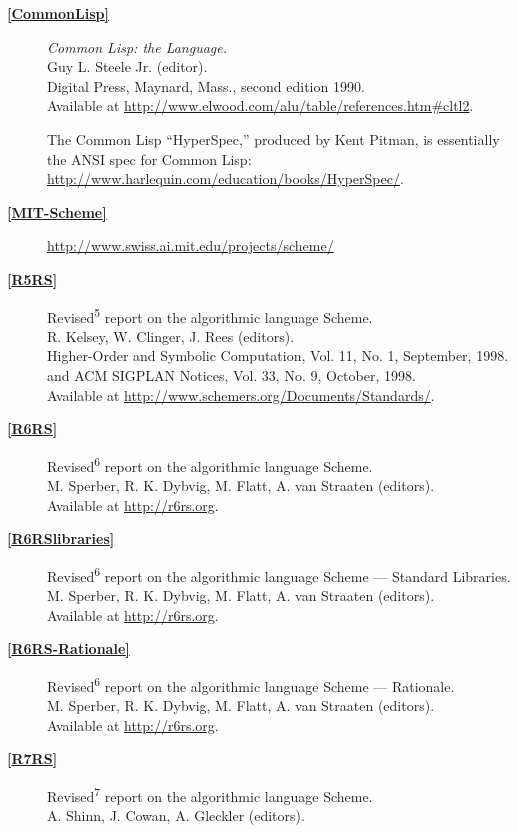 \begin{description}
\item[\textbf{\href{}{{[}CommonLisp{]}}}]
\emph{Common Lisp: the Language.}\\
Guy L. Steele Jr. (editor).\\
Digital Press, Maynard, Mass., second edition 1990.\\
Available at
\url{http://www.elwood.com/alu/table/references.htm\#cltl2}.

The Common Lisp ``HyperSpec,'' produced by Kent Pitman, is essentially
the ANSI spec for Common Lisp:
\url{http://www.harlequin.com/education/books/HyperSpec/}.
\item[\textbf{\href{}{{[}MIT-Scheme{]}}} ]
\url{http://www.swiss.ai.mit.edu/projects/scheme/}
\item[\textbf{\href{}{{[}R5RS{]}}}]
Revised\textsuperscript{5} report on the algorithmic language Scheme.\\
R. Kelsey, W. Clinger, J. Rees (editors).\\
Higher-Order and Symbolic Computation, Vol. 11, No. 1, September,
1998.\\
and ACM SIGPLAN Notices, Vol. 33, No. 9, October, 1998.\\
Available at \url{http://www.schemers.org/Documents/Standards/}.
\item[\textbf{\href{}{{[}R6RS{]}}}]
Revised\textsuperscript{6} report on the algorithmic language Scheme.\\
M. Sperber, R. K. Dybvig, M. Flatt, A. van Straaten (editors).\\
Available at \url{http://r6rs.org}.
\item[\textbf{\href{}{{[}R6RSlibraries{]}}}]
Revised\textsuperscript{6} report on the algorithmic language Scheme ---
Standard Libraries.\\
M. Sperber, R. K. Dybvig, M. Flatt, A. van Straaten (editors).\\
Available at \url{http://r6rs.org}.
\item[\textbf{\href{}{{[}R6RS-Rationale{]}}}]
Revised\textsuperscript{6} report on the algorithmic language Scheme ---
Rationale.\\
M. Sperber, R. K. Dybvig, M. Flatt, A. van Straaten (editors).\\
Available at \url{http://r6rs.org}.
\item[\textbf{\href{}{{[}R7RS{]}}}]
Revised\textsuperscript{7} report on the algorithmic language Scheme.\\
A. Shinn, J. Cowan, A. Gleckler (editors).\\

\end{description}
